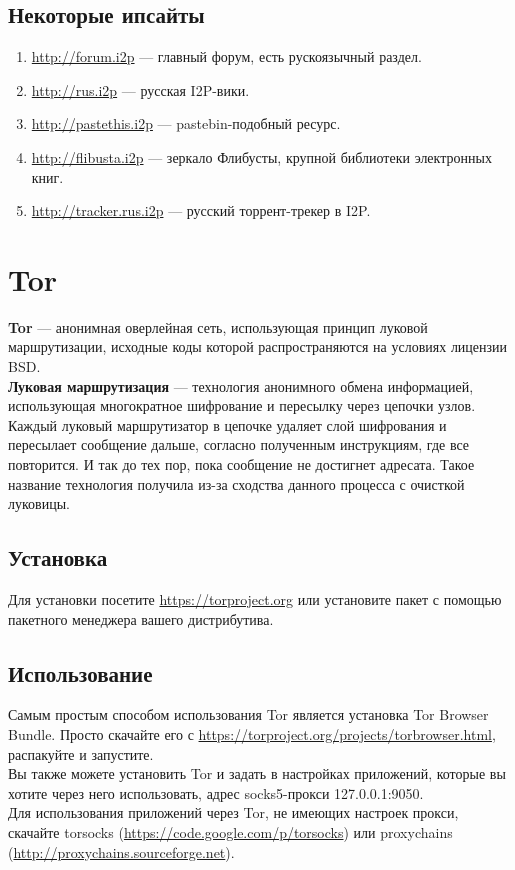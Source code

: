 \subsection{Некоторые ипсайты}
\begin{enumerate}
\item \url{http://forum.i2p} --- главный форум, есть рускоязычный раздел.
\item \url{http://rus.i2p} --- русская I2P-вики.
\item \url{http://pastethis.i2p} --- pastebin-подобный ресурс.
\item \url{http://flibusta.i2p} --- зеркало Флибусты, крупной библиотеки электронных книг.
\item \url{http://tracker.rus.i2p} --- русский торрент-трекер в I2P.
\end{enumerate}
\section{Tor}
\textbf{Tor} --- анонимная оверлейная сеть, использующая принцип луковой маршрутизации, исходные коды которой распространяются на условиях лицензии BSD.\\
\textbf{Луковая маршрутизация} --- технология анонимного обмена информацией, использующая многократное шифрование и пересылку через цепочки узлов. Каждый луковый маршрутизатор в цепочке удаляет слой шифрования и пересылает сообщение дальше, согласно полученным инструкциям, где все повторится. И так до тех пор, пока сообщение не достигнет адресата. Такое название технология получила из-за сходства данного процесса с очисткой луковицы.
\subsection{Установка}
Для установки посетите \url{https://torproject.org} или установите пакет с помощью пакетного менеджера вашего дистрибутива.
\subsection{Использование}
Самым простым способом использования Tor является установка Tor Browser Bundle. Просто скачайте его с \url{https://torproject.org/projects/torbrowser.html}, распакуйте и запустите.\\
Вы также можете установить Tor и задать в настройках приложений, которые вы хотите через него использовать, адрес socks5-прокси 127.0.0.1:9050.\\
Для использования приложений через Tor, не имеющих настроек прокси, скачайте torsocks (\url{https://code.google.com/p/torsocks}) или proxychains (\url{http://proxychains.sourceforge.net}).
